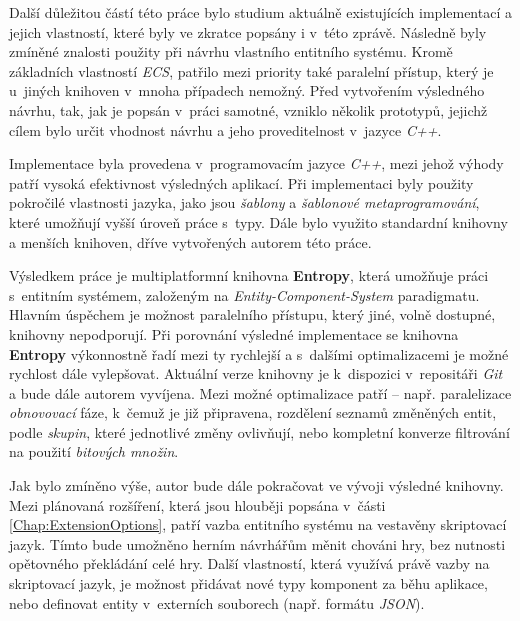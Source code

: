 Další důležitou částí této práce bylo studium aktuálně existujících implementací a jejich vlastností, které byly ve zkratce popsány i v~této zprávě. Následně byly zmíněné znalosti použity při návrhu vlastního entitního systému. Kromě základních vlastností \emph{ECS}, patřilo mezi priority také paralelní přístup, který je u~jiných knihoven v~mnoha případech nemožný. Před vytvořením výsledného návrhu, tak, jak je popsán v~práci samotné, vzniklo několik prototypů, jejichž cílem bylo určit vhodnost návrhu a jeho proveditelnost v~jazyce \emph{C++}. 

Implementace byla provedena v~programovacím jazyce \emph{C++}, mezi jehož výhody patří vysoká efektivnost výsledných aplikací. Při implementaci byly použity pokročilé vlastnosti jazyka, jako jsou \emph{šablony} a \emph{šablonové metaprogramování}, které umožňují vyšší úroveň práce s~typy. Dále bylo využito standardní knihovny a menších knihoven, dříve vytvořených autorem této práce. 



Výsledkem práce je multiplatformní knihovna \textbf{Entropy}, která umožňuje práci s~entitním systémem, založeným na \emph{Entity-Component-System} paradigmatu. Hlavním úspěchem je možnost paralelního přístupu, který jiné, volně dostupné, knihovny nepodporují. Při porovnání výsledné implementace se knihovna \textbf{Entropy} výkonnostně řadí mezi ty rychlejší a s~dalšími optimalizacemi je možné rychlost dále vylepšovat. Aktuální verze knihovny je k~dispozici v~repositáři \emph{Git} \cite{EntropyGit} a bude dále autorem vyvíjena. Mezi možné optimalizace patří -- např. paralelizace \emph{obnovovací} fáze, k~čemuž je již připravena, rozdělení seznamů změněných entit, podle \emph{skupin}, které jednotlivé změny ovlivňují, nebo kompletní konverze filtrování na použití \emph{bitových množin}.

Jak bylo zmíněno výše, autor bude dále pokračovat ve vývoji výsledné knihovny. Mezi plánovaná rozšíření, která jsou hlouběji popsána v~části \ref{Chap:ExtensionOptions}, patří vazba entitního systému na vestavěny skriptovací jazyk. Tímto bude umožněno herním návrhářům měnit chováni hry, bez nutnosti opětovného překládání celé hry. Další vlastností, která využívá právě vazby na skriptovací jazyk, je možnost přidávat nové typy komponent za běhu aplikace, nebo definovat entity v~externích souborech (např. formátu \emph{JSON}). 


